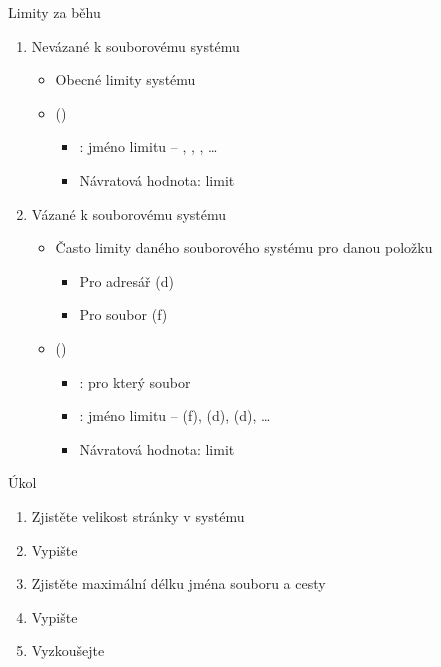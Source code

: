 
\begin{frame}{Limity za běhu}

  \begin{enumerate}
    \item Nevázané k souborovému systému
    \begin{itemize}
      \item Obecné limity systému

      \pause

      \item {} ()
      \begin{itemize}
	\item {}: jméno limitu -- ,
	  , , \dots
	\item Návratová hodnota: limit
      \end{itemize}
    \end{itemize}

    \pause

    \item Vázané k souborovému systému
    \begin{itemize}
      \item Často limity daného souborového systému pro danou položku
      \begin{itemize}
	\item Pro adresář (d)
	\item Pro soubor (f)
      \end{itemize}

      \pause

      \item {}
	()
      \begin{itemize}
	\item {}: pro který soubor
	\item {}: jméno limitu --  (f),
	   (d),  (d), \dots
	\item Návratová hodnota: limit
      \end{itemize}
    \end{itemize}
  \end{enumerate}

\end{frame}

\begin{frame}{Úkol}

  \begin{enumerate}
    \item Zjistěte velikost stránky v systému
    \item Vypište
    \item Zjistěte maximální délku jména souboru a cesty
    \item Vypište
    \item Vyzkoušejte
  \end{enumerate}

\end{frame}

